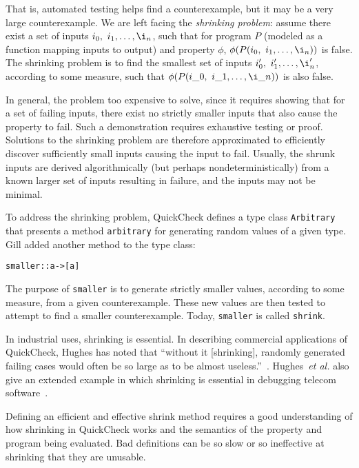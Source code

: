 \documentclass{sigplanconf}
\newenvironment{code}{\begin{alltt}\footnotesize}{\end{alltt}}
\newcommand{\ttp}[1]{\texttt{#1}}
\begin{document}
That is, automated testing helps find a counterexample, but it may be a very
large counterexample.  We are left facing the \emph{shrinking problem}: assume
there exist a set of inputs $i_0, \ i_1, \ldots, \i_n$, such that for program
$P$ (modeled as a function mapping inputs to output) and property $\phi$,
$\phi(P(i_0, \ i_1, \ldots, \i_n))$ is false.  The shrinking problem is to find
the smallest set of inputs $i'_0, \ i'_1, \ldots, \i'_n$, according to some
measure, such that $\phi(P(i\_0, \ i\_1, \ldots, \i\_n))$ is also false.

In general, the problem too expensive to solve, since it requires showing that
for a set of failing inputs, there exist no strictly smaller inputs that also
cause the property to fail.  Such a demonstration requires exhaustive testing or
proof.  Solutions to the shrinking problem are therefore approximated to
efficiently discover sufficiently small inputs causing the input to fail.
Usually, the shrunk inputs are derived algorithmically (but perhaps
nondeterministically) from a known larger set of inputs resulting in failure,
and the inputs may not be minimal.

To address the shrinking problem, QuickCheck defines a type class
\ttp{Arbitrary} that presents a method \ttp{arbitrary} for generating random
values of a given type.  Gill added another method to the type class:
%
\begin{code}
smaller :: a -> [a]
\end{code}
%
\noindent
The purpose of \ttp{smaller} is to generate strictly smaller values, according
to some measure, from a given counterexample.  These new values are then tested
to attempt to find a smaller counterexample.  Today, \ttp{smaller} is called
\ttp{shrink}.

In industrial uses, shrinking is essential.  In describing commercial
applications of QuickCheck, Hughes has noted that ``without it [shrinking],
randomly generated failing cases would often be so large as to be almost
useless.''~\cite{qcjh}.  Hughes~\emph{et al.} also give an extended example in
which shrinking is essential in debugging telecom software~\cite{telecom}.

Defining an efficient and effective shrink method requires a good understanding
of how shrinking in QuickCheck works and the semantics of the property and
program being evaluated.  Bad definitions can be so slow or so ineffective at
shrinking that they are unusable.
\end{document}
